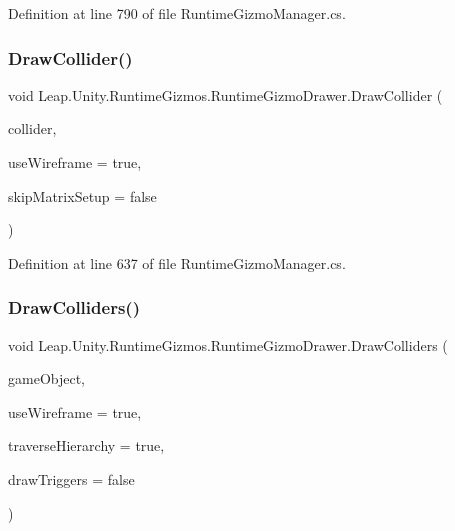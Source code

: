 Definition at line 790 of file Runtime\+Gizmo\+Manager.\+cs.

\mbox{\label{class_leap_1_1_unity_1_1_runtime_gizmos_1_1_runtime_gizmo_drawer_a4f7c328555af1aa997feb8eca14639e3}} 
\subsubsection{\texorpdfstring{DrawCollider()}{DrawCollider()}}
{\footnotesize\ttfamily void Leap.\+Unity.\+Runtime\+Gizmos.\+Runtime\+Gizmo\+Drawer.\+Draw\+Collider (\begin{DoxyParamCaption}\item[{Collider}]{collider,  }\item[{bool}]{use\+Wireframe = {\ttfamily true},  }\item[{bool}]{skip\+Matrix\+Setup = {\ttfamily false} }\end{DoxyParamCaption})}



Definition at line 637 of file Runtime\+Gizmo\+Manager.\+cs.

\mbox{\label{class_leap_1_1_unity_1_1_runtime_gizmos_1_1_runtime_gizmo_drawer_a16bef61806ee819707718cf4f347cd29}} 
\subsubsection{\texorpdfstring{DrawColliders()}{DrawColliders()}}
{\footnotesize\ttfamily void Leap.\+Unity.\+Runtime\+Gizmos.\+Runtime\+Gizmo\+Drawer.\+Draw\+Colliders (\begin{DoxyParamCaption}\item[{Game\+Object}]{game\+Object,  }\item[{bool}]{use\+Wireframe = {\ttfamily true},  }\item[{bool}]{traverse\+Hierarchy = {\ttfamily true},  }\item[{bool}]{draw\+Triggers = {\ttfamily false} }\end{DoxyParamCaption})}



